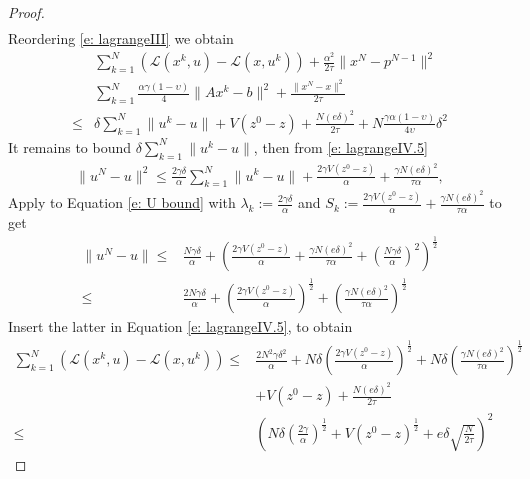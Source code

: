 \documentclass[11pt]{report}
\theoremstyle{plain}{\theorembodyfont{\rmfamily}%
\newtheorem{assumption}[theorem]{Assumption}}
\theoremstyle{plain}{\theorembodyfont{\rmfamily}%
\newtheorem{algorithm}[theorem]{Algorithm}}
\theoremstyle{plain}{\theorembodyfont{\rmfamily}%
\newtheorem{example}[theorem]{Example}}
\theoremstyle{plain}{\theorembodyfont{\rmfamily}%
\newtheorem{remark}[theorem]{Remark}}
\theoremstyle{plain}{\theorembodyfont{\rmfamily}%
\newtheorem{definition}[theorem]{Definition}}
\theoremstyle{plain}{\theorembodyfont{\rmfamily}%
\newtheorem{problem}[theorem]{Problem}}
\numberwithin{equation}{chapter}
\newcommand{\dal}{u}
\newcommand{\prim}{x}
\newcommand{\proj}{p}
\begin{document}
\begin{proof}
\begin{align}
        \label{e: Axsep}
    \end{align}
    Reordering \eqref{e: lagrangeIII} we obtain
     \begin{align}
        &\sum_{k=1}^{N}\left(\mathcal{L}(\prim^{k},\dal)-\mathcal{L}(\prim,\dal^{k})\right)+\frac{\alpha^2}{2\tau}\|\prim^{N}-\proj^{N-1}\|^2\nonumber\\&\sum_{k=1}^{N}\frac{\alpha\gamma(1-\upsilon)}{4}\|A\prim^{k}-b\|^2+\frac{\|\prim^{N}-\prim\|^2}{2\tau} \nonumber\\\leq& \delta\sum_{k=1}^{N}\|\dal^{k}-\dal\|+V(z^{0}-z)+\frac{N(e\delta)^2}{2\tau}+N\frac{\gamma\alpha(1-\upsilon)}{4\upsilon}\delta^2
        \label{e: lagrangeIV}
    \end{align}
    It remains to bound $\delta\sum_{k=1}^{N}\|\dal^{k}-\dal\|$, then from \eqref{e: lagrangeIV.5} 
    \begin{align}
     \|\dal^{N}-\dal\|^2\leq\frac{2\gamma\delta}{\alpha}  \sum_{k=1}^{N}\|\dal^{k}-\dal\|+\frac{2\gamma V(z^{0}-z)}{\alpha}+\frac{\gamma N(e\delta)^2}{\tau\alpha} ,
        \label{e: U bound}
    \end{align}
    Apply \cite[Lemma A.1]{Chabolle-Rash} to Equation \eqref{e: U bound} with $\lambda_{k}:=\frac{2\gamma\delta}{\alpha} $ and $S_{k}:= \frac{2\gamma V(z^{0}-z)}{\alpha}+\frac{\gamma N(e\delta)^2}{\tau\alpha}$  to get
    \begin{align}
      \|\dal^{N}-\dal\|\leq& \frac{N\gamma\delta}{\alpha}+\left(\frac{2\gamma V(z^{0}-z)}{\alpha}+\frac{\gamma N(e\delta)^2}{\tau\alpha}+\left(\frac{N\gamma\delta}{\alpha}\right)^2\right)^{\frac{1}{2}}\nonumber\\\leq& \frac{2N\gamma\delta}{\alpha}+\left(\frac{2\gamma V(z^{0}-z)}{\alpha}\right)^{\frac{1}{2}}+\left(\frac{\gamma N(e\delta)^2}{\tau\alpha}\right)^{\frac{1}{2}}
    \end{align}
    Insert the latter in Equation \eqref{e: lagrangeIV.5}, to obtain
     \begin{align}
        \sum_{k=1}^{N}\left(\mathcal{L}(\prim^{k},\dal)-\mathcal{L}(\prim,\dal^{k})\right)\leq& \frac{2N^2\gamma\delta^2}{\alpha}+N\delta\left(\frac{2\gamma V(z^{0}-z)}{\alpha}\right)^{\frac{1}{2}}+N\delta\left(\frac{\gamma N(e\delta)^2}{\tau\alpha}\right)^{\frac{1}{2}}\nonumber\\ &+V(z^{0}-z)+\frac{N(e\delta)^2}{2\tau}\nonumber\\\leq& \left(N\delta\left(\frac{2\gamma}{\alpha}\right)^{\frac{1}{2}}+V(z^{0}-z)^{\frac{1}{2}}+e\delta\sqrt{\frac{N}{2\tau}}\right)^2
        \label{e: lagrangeV}
    \end{align}
    

\end{proof}
\end{document}
